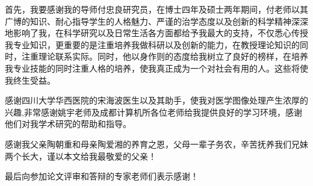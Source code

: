 首先，我要感谢我的导师付忠良研究员，在博士四年及硕士两年期间，付老师以其广博的知识、耐心指导学生的人格魅力、严谨的治学态度以及创新的科学精神深深地影响了我，在科学研究以及日常生活各方面都给予我最大的支持，不仅悉心传授我专业知识，更重要的是注重培养我做科研以及创新的能力，在教授理论知识的同时，注重理论联系实际。同时，他以身作则的态度给我树立了良好的榜样，在培养我专业技能的同时注重人格的培养，使我真正成为一个对社会有用的人。这些将使我终生受益。

感谢四川大学华西医院的宋海波医生以及其助手，使我对医学图像处理产生浓厚的兴趣,非常感谢姚宇老师及成都计算机所各位老师给我提供良好的学习环境，感谢他们对我学术研究的帮助和指导。

感谢我父亲陶朝重和母亲陶爱湘的养育之恩，父母一辈子务农，辛苦抚养我们兄妹两个长大，谨以本文给我最敬爱的父亲！

最后向参加论文评审和答辩的专家老师们表示感谢！